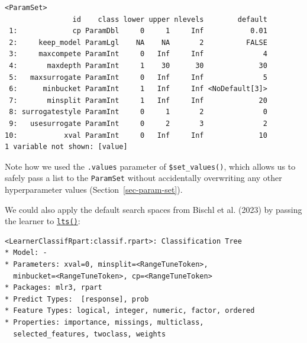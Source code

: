 \begin{Shaded}
\begin{Highlighting}[]
\OtherTok{=} \NormalTok{(}\NormalTok{)}
\SpecialCharTok{$}\SpecialCharTok{$}\NormalTok{(}
\SpecialCharTok{$}
\end{Highlighting}
\end{Shaded}

\begin{verbatim}
<ParamSet>
                id    class lower upper nlevels        default
 1:             cp ParamDbl     0     1     Inf           0.01
 2:     keep_model ParamLgl    NA    NA       2          FALSE
 3:     maxcompete ParamInt     0   Inf     Inf              4
 4:       maxdepth ParamInt     1    30      30             30
 5:   maxsurrogate ParamInt     0   Inf     Inf              5
 6:      minbucket ParamInt     1   Inf     Inf <NoDefault[3]>
 7:       minsplit ParamInt     1   Inf     Inf             20
 8: surrogatestyle ParamInt     0     1       2              0
 9:   usesurrogate ParamInt     0     2       3              2
10:           xval ParamInt     0   Inf     Inf             10
1 variable not shown: [value]
\end{verbatim}

Note how we used the \texttt{.values} parameter of
\texttt{\$set\_values()}, which allows us to safely pass a list to the
\texttt{ParamSet} without accidentally overwriting any other
hyperparameter values (Section~\ref{sec-param-set}).

We could also apply the default search spaces from Bischl et al. (2023)
by passing the learner to
\href{https://mlr3tuningspaces.mlr-org.com/reference/lts.html}{\texttt{lts()}}:

\begin{Shaded}
\begin{Highlighting}[]
\NormalTok{(}\NormalTok{(}\NormalTok{))}
\end{Highlighting}
\end{Shaded}

\begin{verbatim}
<LearnerClassifRpart:classif.rpart>: Classification Tree
* Model: -
* Parameters: xval=0, minsplit=<RangeTuneToken>,
  minbucket=<RangeTuneToken>, cp=<RangeTuneToken>
* Packages: mlr3, rpart
* Predict Types:  [response], prob
* Feature Types: logical, integer, numeric, factor, ordered
* Properties: importance, missings, multiclass,
  selected_features, twoclass, weights
\end{verbatim}

